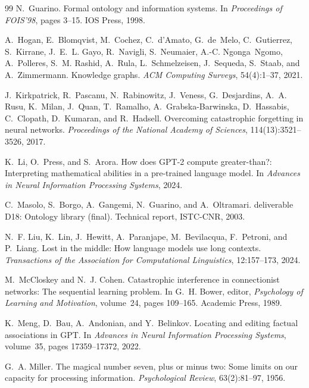 \documentclass[11pt]{article}
\theoremstyle{definition}
\begin{document}
\begin{thebibliography}{99}
N.~Guarino.
\newblock Formal ontology and information systems.
\newblock In \emph{Proceedings of FOIS'98}, pages 3--15. IOS Press, 1998.

A.~Hogan, E.~Blomqvist, M.~Cochez, C.~d'Amato, G.~de~Melo, C.~Gutierrez,
  S.~Kirrane, J.~E.~L. Gayo, R.~Navigli, S.~Neumaier, A.-C. Ngonga~Ngomo,
  A.~Polleres, S.~M. Rashid, A.~Rula, L.~Schmelzeisen, J.~Sequeda, S.~Staab,
  and A.~Zimmermann.
\newblock Knowledge graphs.
\newblock \emph{ACM Computing Surveys}, 54(4):1--37, 2021.

J.~Kirkpatrick, R.~Pascanu, N.~Rabinowitz, J.~Veness, G.~Desjardins,
  A.~A. Rusu, K.~Milan, J.~Quan, T.~Ramalho, A.~Grabska-Barwinska,
  D.~Hassabis, C.~Clopath, D.~Kumaran, and R.~Hadsell.
\newblock Overcoming catastrophic forgetting in neural networks.
\newblock \emph{Proceedings of the National Academy of Sciences},
  114(13):3521--3526, 2017.

K.~Li, O.~Press, and S.~Arora.
\newblock How does {GPT}-2 compute greater-than?: Interpreting mathematical
  abilities in a pre-trained language model.
\newblock In \emph{Advances in Neural Information Processing Systems}, 2024.

C.~Masolo, S.~Borgo, A.~Gangemi, N.~Guarino, and A.~Oltramari.
 deliverable {D18}: Ontology library (final).
\newblock Technical report, ISTC-CNR, 2003.

N.~F. Liu, K.~Lin, J.~Hewitt, A.~Paranjape, M.~Bevilacqua, F.~Petroni, and
  P.~Liang.
\newblock Lost in the middle: How language models use long contexts.
\newblock \emph{Transactions of the Association for Computational Linguistics},
  12:157--173, 2024.

M.~McCloskey and N.~J. Cohen.
\newblock Catastrophic interference in connectionist networks: The sequential
  learning problem.
\newblock In G.~H. Bower, editor, \emph{Psychology of Learning and Motivation},
  volume~24, pages 109--165. Academic Press, 1989.

K.~Meng, D.~Bau, A.~Andonian, and Y.~Belinkov.
\newblock Locating and editing factual associations in {GPT}.
\newblock In \emph{Advances in Neural Information Processing Systems},
  volume~35, pages 17359--17372, 2022.

G.~A. Miller.
\newblock The magical number seven, plus or minus two: Some limits on our
  capacity for processing information.
\newblock \emph{Psychological Review}, 63(2):81--97, 1956.


\end{thebibliography}
\end{document}
